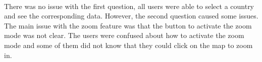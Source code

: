 \documentclass{report}
\begin{document}
\noindent
\begin{minipage}[t]{0.45\textwidth}
    \centering
\end{minipage}
\hfill
\begin{minipage}[t]{0.45\textwidth}
    \centering
\end{minipage}
\newline
\\There was no issue with the first question, all users were able to select a country and see the corresponding data. However, the second question caused some issues. The main issue with the zoom feature was that the button to activate the zoom mode was not clear. The users were confused about how to activate the zoom mode and some of them did not know that they could click on the map to zoom in.\\
\end{document}
